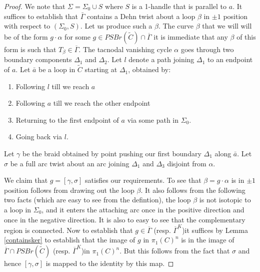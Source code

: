 \documentclass{article}
\begin{document}
\begin{proof}
    We note that $\Sigma= \Sigma_0 \cup S$ where $S$ is a 1-handle that is parallel to $a$.
    It suffices to establish that $\bar \Gamma$ contains a Dehn twist about a loop $\beta$ in $\pm 1$ position with respect to $(\Sigma_0, S)$.  Let us produce such a $\beta$. The curve $\beta$ that we will will be of the form $g \cdot \alpha$ for some $g \in PSBr(\tilde C) \cap \overline{\Gamma}$  it is immediate that any $\beta$ of this form is such that $T_{\beta} \in \overline{\Gamma}.$
    The tacnodal vanishing cycle $\alpha$ goes through two boundary components $\Delta_1$ and $\Delta_2.$ 
    Let $l$ denote a path joining $\Delta_1$ to an endpoint of $a$.
    Let $\bar a$ be a loop in $\tilde C$ starting at $\Delta_1$, obtained by:
    \begin{enumerate}
        \item Following $l$ till we  reach $a$
        \item Following $a$ till we reach the other endpoint
        \item Returning to the first endpoint of $a$  via some path in $\Sigma_0.$
        \item Going back via $l$.
    \end{enumerate}
    Let $\gamma$ be the braid obtained by point pushing our first boundary  $\Delta_1$ along  $\bar a.$
    Let $\sigma$ be a full arc twist about an arc joining $\Delta_1$ and $\Delta_3$ disjoint from $\alpha$.
 
    We claim that $g = [\gamma, \sigma]$ satisfies our requirements.
    To see that $\beta = g \cdot \alpha$ is in $\pm 1$ position follows from drawing out the loop $\beta$. It also follows from the following two facts (which are easy to see from the defintion), the loop $\beta$ is not isotopic to a loop in $\Sigma_0$, and it enters the  attaching arc once in the positive direction and once in the negative direction. It is also to easy to see that the complementary region is connected. Now to establish that $g \in \overline {\Gamma}$  (resp. $\overline{\Gamma}^K$)it suffices by Lemma \ref{containsker} to establish that the image of $g$ in $\pi_1(C)^n$  is in the image of $\overline{\Gamma} \cap PSBr(\tilde C)$ (resp. $\overline{\Gamma}^K$)in $\pi_1(C)^n.$ But this follows from the fact that $\sigma$ and hence $[\gamma,\sigma]$ is mapped to the identity by this map.
\end{proof}
\end{document}
